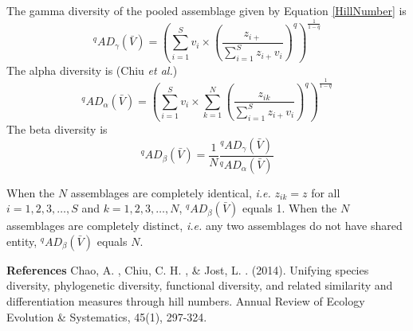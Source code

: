 \documentclass[11pt]{article}
\begin{document}
\newline

The gamma diversity of the pooled assemblage given by Equation \ref{HillNumber} is 
\begin{equation}
    ^qAD_{\gamma}(\bar{V}) = (\sum_{i=1}^{S}v_i \times (\frac{z_{i+}}{\sum_{i=1}^{S}z_{i+}v_i})^q )^{\frac{1}{1-q}}
    \label{Gamma}
\end{equation}
The alpha diversity is (Chiu \textit{et al.}) 
\begin{equation}
    ^qAD_{\alpha}(\bar{V}) = ( \sum_{i=1}^{S}v_i \times \sum_{k=1}^{N} (\frac{z_{ik}}{\sum_{i=1}^{S}z_{i+}v_i} )^q )^{\frac{1}{1-q}}
    \label{Alpha}
\end{equation}
The beta diversity is
\begin{equation}
    ^qAD_{\beta}(\bar{V}) = \frac{1}{N}\frac{^qAD_{\gamma}(\bar{V})}{^qAD_{\alpha}(\bar{V})}
\end{equation}

\newline

When the $N$ assemblages are completely identical, \textit{i.e.} $z_{ik}=z$ for all $i=1,2,3,\dots,S$ and $k=1,2,3,\dots,N$, $^qAD_{\beta}(\bar{V})$ equals 1. 
When the $N$ assemblages are completely distinct, \textit{i.e.} any two assemblages do not have shared entity, $^qAD_{\beta}(\bar{V})$ equals $N$.

\newpage
\textbf{References} %
\newline
[1] Chao, A. , Chiu, C. H. , & Jost, L. . (2014). Unifying species diversity, phylogenetic diversity, functional diversity, and related similarity and differentiation measures through hill numbers. Annual Review of Ecology Evolution & Systematics, 45(1), 297-324.
\end{document}
